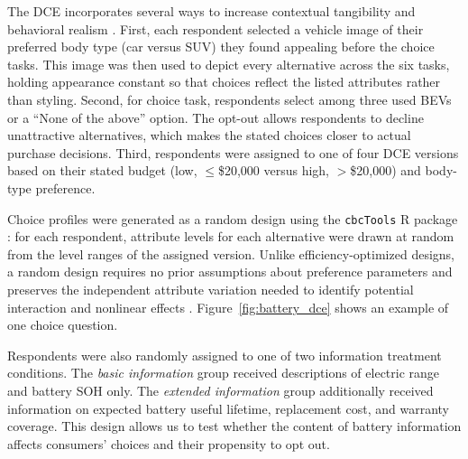 \documentclass[a4paper,fleqn]{cas-sc}   %
\begin{document}
The DCE incorporates several ways to increase contextual tangibility and behavioral realism \parencite{haghaniHypotheticalBiasStated2021}. First, each respondent selected a vehicle image of their preferred body type (car versus SUV) they found appealing before the choice tasks. This image was then used to depict every alternative across the six tasks, holding appearance constant so that choices reflect the listed attributes rather than styling. Second, for choice task, respondents select among three used BEVs or a ``None of the above'' option. The opt-out allows respondents to decline unattractive alternatives, which makes the stated choices closer to actual purchase decisions. Third, respondents were assigned to one of four DCE versions based on their stated budget (low, $\leq$\$20,000 versus high, $>$\$20,000) and body-type preference. 

Choice profiles were generated as a random design using the \texttt{cbcTools} R package \parencite{helvestonCbcToolsDesignAnalyze2025}: for each respondent, attribute levels for each alternative were drawn at random from the level ranges of the assigned version. Unlike efficiency-optimized designs, a random design requires no prior assumptions about preference parameters and preserves the independent attribute variation needed to identify potential interaction and nonlinear effects \parencite{trainDiscreteChoiceMethods2009}. Figure~\ref{fig:battery_dce} shows an example of one choice question. 

Respondents were also randomly assigned to one of two information treatment conditions. The \textit{basic information} group received descriptions of electric range and battery SOH only. The \textit{extended information} group additionally received information on expected battery useful lifetime, replacement cost, and warranty coverage. This design allows us to test whether the content of battery information affects consumers' choices and their propensity to opt out. 
\end{document}
